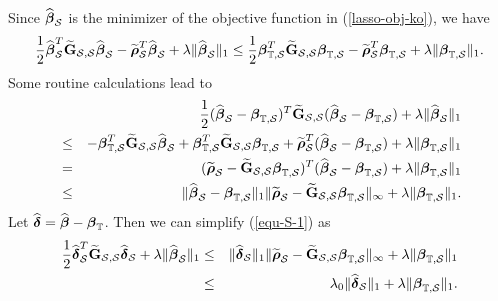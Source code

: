 \documentclass[11pt]{article}
\newcommand{\bG}{\mbox{\bf G}}
\newcommand{\bbeta}{\mbox{\boldmath $\beta$}}
\newcommand{\brho}{\mbox{\boldmath $\rho$}}
\newcommand{\bdelta}{\mbox{\boldmath $\delta$}}
\newcommand{\wh}{\widehat}
\begin{document}
		Since $\wh{\bbeta}_{\mathcal{S}}$ is the minimizer of the objective function  in (\ref{lasso-obj-ko}), we have
		\begin{eqnarray*}
			\dfrac{1}{2}\widehat{\bbeta}_{\mathcal{S}}^T\widetilde{\bG}_{\mathcal{S}, \mathcal{S}}\widehat{\bbeta}_{\mathcal{S}}-\widetilde{\brho}_{\mathcal{S}}^T\widehat{\bbeta}_{\mathcal{S}}+\lambda\|\widehat{\bbeta}_\mathcal{S}\|_1\le \dfrac{1}{2}\bbeta_{\mathbb{T},\mathcal{S}}^{T}\widetilde{\bG}_{\mathcal{S}, \mathcal{S}}\bbeta_{\mathbb{T},\mathcal{S}}-\widetilde{\brho}_{\mathcal S}^T\bbeta_{\mathbb{T},\mathcal{S}}+\lambda\|\bbeta_{\mathbb{T},\mathcal{S}}\|_1.
		\end{eqnarray*}
Some routine calculations lead to
		\begin{eqnarray}\nonumber
		&&\dfrac{1}{2}(\widehat{\bbeta}_\mathcal{S}-\bbeta_{\mathbb{T},\mathcal{S}})^T\widetilde{\bG}_{\mathcal{S},\mathcal{S}}(\widehat{\bbeta}_\mathcal{S}-\bbeta_{\mathbb{T},\mathcal{S}})+\lambda\|\widehat{\bbeta}_\mathcal{S}\|_1\\\nonumber
		&\le& -\bbeta_{\mathbb{T},\mathcal{S}}^{T}\widetilde{\bG}_{\mathcal{S},\mathcal{S}}\widehat{\bbeta}_{\mathcal{S}}+\bbeta_{\mathbb{T},\mathcal{S}}^{T}\widetilde{\bG}_{\mathcal{S},\mathcal{S}}\bbeta_{\mathbb{T},\mathcal{S}}+\widetilde{\brho}_{\mathcal{S}}^T(\widehat{\bbeta}_\mathcal{S}-\bbeta_{\mathbb{T},\mathcal{S}})+\lambda\|\bbeta_{\mathbb{T},\mathcal{S}}\|_1\\\nonumber
		&=&(\widetilde{\brho}_\mathcal{S}-\widetilde{\bG}_{\mathcal{S},\mathcal{S}}\bbeta_{\mathbb{T},\mathcal{S}})^T(\widehat{\bbeta}_\mathcal{S}-\bbeta_{\mathbb{T},\mathcal{S}})+\lambda\|\bbeta_{\mathbb{T},\mathcal{S}}\|_1\\\label{equ-S-1}
		&\le& \|\widehat{\bbeta}_{\mathcal{S}}-\bbeta_{\mathbb{T},\mathcal{S}}\|_1\|\widetilde{\brho}_{\mathcal{S}}-\widetilde{\bG}_{\mathcal{S},\mathcal{S}}\bbeta_{\mathbb{T},\mathcal{S}}\|_{\infty}+\lambda\|\bbeta_{\mathbb{T},\mathcal{S}}\|_1.
		\end{eqnarray}
		Let $\widehat{\bdelta}=\widehat{\bbeta}-\bbeta_{\mathbb{T}}$. Then we can simplify (\ref{equ-S-1}) as
		\begin{eqnarray}\label{equ-S-2}
		\dfrac{1}{2}\widehat{\bdelta}_\mathcal{S}^T\widetilde{\bG}_{\mathcal{S},\mathcal{S}}\widehat{\bdelta}_\mathcal{S}+\lambda\|\widehat{\bbeta}_{\mathcal{S}}\|_1&\le& \|\widehat{\bdelta}_\mathcal{S}\|_1\|\widetilde{\brho}_{\mathcal{S}}-\widetilde{\bG}_{\mathcal{S},\mathcal{S}}\bbeta_{\mathbb{T},\mathcal{S}}\|_{\infty}+\lambda\|\bbeta_{\mathbb{T},\mathcal{S}}\|_1 \nonumber\\
		& \le&\lambda_0 \|\widehat{\bdelta}_\mathcal{S}\|_1 + \lambda\|\bbeta_{\mathbb{T},\mathcal{S}}\|_1.
		\end{eqnarray}
\end{document}
